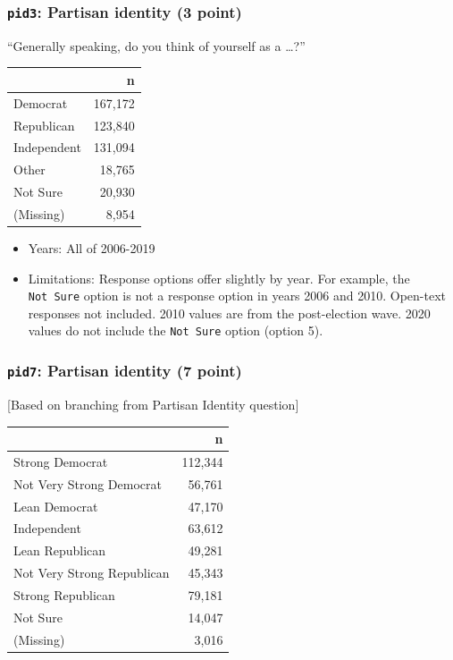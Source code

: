 \documentclass[10pt,article,oneside]{memoir}
\theoremstyle{definition}
\begin{document}
\hypertarget{pid3-partisan-identity-3-point}{%
\subsubsection{\texorpdfstring{\texttt{pid3}: Partisan identity (3
point)}{pid3: Partisan identity (3 point)}}\label{pid3-partisan-identity-3-point}}

``Generally speaking, do you think of yourself as a \ldots?''

\begin{table}[H]
\centering
\begin{tabular}{lr}
\toprule
 & n\\
\midrule
Democrat & 167,172\\
Republican & 123,840\\
Independent & 131,094\\
Other & 18,765\\
Not Sure & 20,930\\
(Missing) & 8,954\\
\bottomrule
\end{tabular}
\end{table}

\begin{itemize}
\tightlist
\item
  Years: All of 2006-2019
\item
  Limitations: Response options offer slightly by year. For example, the
  \texttt{Not\ Sure} option is not a response option in years 2006 and
  2010. Open-text responses not included. 2010 values are from the
  post-election wave. 2020 values do not include the \texttt{Not\ Sure}
  option (option 5).
\end{itemize}

\hypertarget{pid7-partisan-identity-7-point}{%
\subsubsection{\texorpdfstring{\texttt{pid7}: Partisan identity (7
point)}{pid7: Partisan identity (7 point)}}\label{pid7-partisan-identity-7-point}}

{[}Based on branching from Partisan Identity question{]}

\begin{table}[H]
\centering
\begin{tabular}{lr}
\toprule
 & n\\
\midrule
Strong Democrat & 112,344\\
Not Very Strong Democrat & 56,761\\
Lean Democrat & 47,170\\
Independent & 63,612\\
Lean Republican & 49,281\\
Not Very Strong Republican & 45,343\\
Strong Republican & 79,181\\
Not Sure & 14,047\\
(Missing) & 3,016\\
\bottomrule
\end{tabular}
\end{table}
\end{document}
